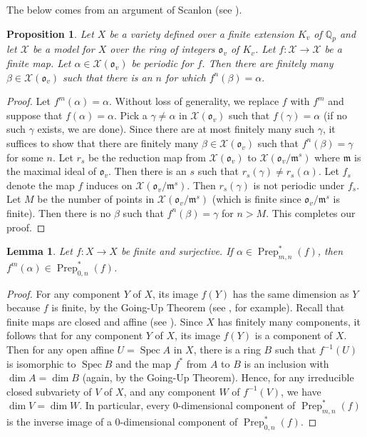 \documentclass{amsart}
\newcommand{\lra}{\longrightarrow}
\newcommand{\bQ}{\mathbb{Q}}
\DeclareMathOperator{\Prep}{Prep}
\DeclareMathOperator{\Spec}{Spec}
\newcommand{\fm}{\mathfrak m}
\newcommand{\fo}{\mathfrak o}
\newcommand{\cX}{\mathcal X}
\newtheorem{prop}[thm]{Proposition}
\newtheorem{lem}[thm]{Lemma}
\theoremstyle{definition}
\begin{document}
The below comes from an argument of Scanlon (see \cite[Section
3]{Scanlon}).


\begin{prop}\label{preimage}
Let $X$ be a variety defined over a finite extension $K_v$ of
$\bQ_p$ and let $\cX$ be a model for $X$ over the ring of integers
$\fo_v$ of $K_v$.  Let $f: \cX \lra \cX$ be a finite map.  Let $\alpha
\in \cX(\fo_v)$ be periodic for $f$.  Then there are finitely many
$\beta \in \cX(\fo_v)$ such that there is an $n$ for which $f^n(\beta)
= \alpha.$
 \end{prop}
 \begin{proof}
   Let $f^m(\alpha) = \alpha$. Without loss of generality, we replace
   $f$ with $f^m$ and suppose that $f(\alpha) = \alpha$.  Pick a
   $\gamma \not= \alpha$ in $\cX(\fo_v)$ such that
   $f(\gamma) = \alpha$ (if no such $\gamma$ exists, we are done).
   Since there are at most finitely many such $\gamma$, it suffices to
   show that there are finitely many $\beta \in \cX(\fo_v)$ such that
   $f^n(\beta) = \gamma$ for some $n$.  Let $r_s$ be the reduction map
   from $\cX(\fo_v)$ to $\cX(\fo_v/\fm^s)$ where $\fm$ is the maximal
   ideal of $\fo_v$.  Then there is an $s$ such that
   $r_s(\gamma) \not= r_s(\alpha)$.  Let $f_s$ denote the map $f$
   induces on $\cX(\fo_v/\fm^s)$.  Then $r_s(\gamma)$ is not periodic
   under $f_s$.  Let $M$ be the number of points in $\cX(\fo_v/\fm^s)$
   (which is finite since $\fo_v / \fm^s$ is finite).  Then there is
   no $\beta$ such that $f^n(\beta) = \gamma$ for $n > M$.  This
   completes our proof.
 \end{proof}

 \begin{lem}\label{dim}
   Let $f: X \lra X$ be finite and surjective.  If
   $\alpha \in \Prep^*_{m,n}(f)$, then
   $f^m(\alpha) \in \Prep^*_{0,n}(f)$.
 \end{lem}
 \begin{proof}
   For any component $Y$ of $X$, its image $f(Y)$ has the same
   dimension as $Y$ because $f$ is finite, by the Going-Up Theorem
   (see \cite[Theorem 5.16]{AM}, for example).  Recall that finite
   maps are closed and affine (see \cite[Chapter II, Ex. 3.4 and
   3.5]{Har}). Since $X$ has finitely many components, it follows that
   for any component $Y$ of $X$, its image $f(Y)$ is a component of
   $X$.  Then for any open affine $U = \Spec A$ in $X$, there is a ring
   $B$ such that $f^{-1}(U)$ is isomorphic to $\Spec B$
   and the map $f^*$ from $A$ to $B$ is an inclusion with
   $\dim A = \dim B$ (again, by the Going-Up Theorem).  Hence, for any
   irreducible closed subvariety of $V$ of $X$, and any component $W$
   of $f^{-1}(V)$, we have $\dim V = \dim W$.  In particular, every
   0-dimensional component of $\Prep^*_{m,n}(f)$ is the inverse image
   of a 0-dimensional component of $\Prep^*_{0,n}(f)$.
   \end{proof}
\end{document}
